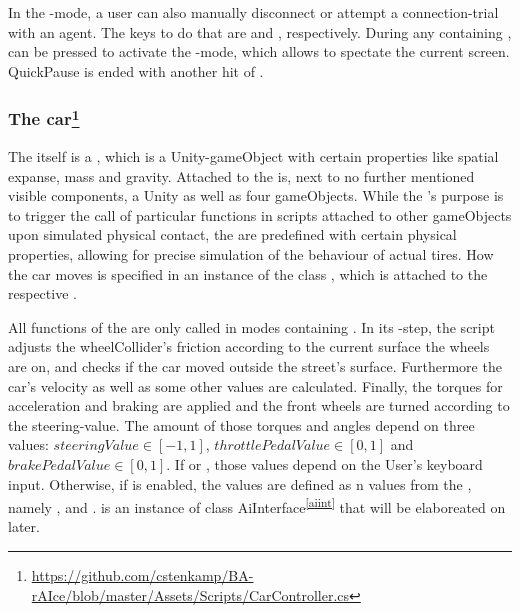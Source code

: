In the -mode, a user can also manually disconnect or attempt a connection-trial with an agent. The keys to do that are  and , respectively. During any  containing ,  can be pressed to activate the -mode, which allows to spectate the current screen. QuickPause is ended with another hit of . 

\subsubsection{The car\footnote{\url{https://github.com/cstenkamp/BA-rAIce/blob/master/Assets/Scripts/CarController.cs}}}

The  itself is a , which is a Unity-gameObject with certain properties like spatial expanse, mass and gravity. Attached to the  is, next to no further mentioned visible components, a Unity  as well as four  gameObjects. While the 's purpose is to trigger the call of particular functions in scripts attached to other gameObjects upon simulated physical contact, the  are predefined with certain physical properties, allowing for precise simulation of the behaviour of actual tires. How the car moves is specified in an instance of the class , which is attached to the respective .

All functions of the  are only called in modes containing . In its -step, the script adjusts the wheelCollider's friction according to the current surface the wheels are on, and checks if the car moved outside the street's surface. Furthermore the car's velocity as well as some other values are calculated. Finally, the torques for acceleration and braking are applied and the front wheels are turned according to the steering-value. The amount of those torques and angles depend on three values: $steeringValue \in [-1,1]$, $throttlePedalValue \in [0,1]$ and $brakePedalValue \in [0,1]$. If  or , those values depend on the User's keyboard input. Otherwise, if  is enabled, the values are defined as n values from the , namely ,  and .  is an instance of class AiInterface\textsuperscript{\ref{aiint}} that will be elaboreated on later.

